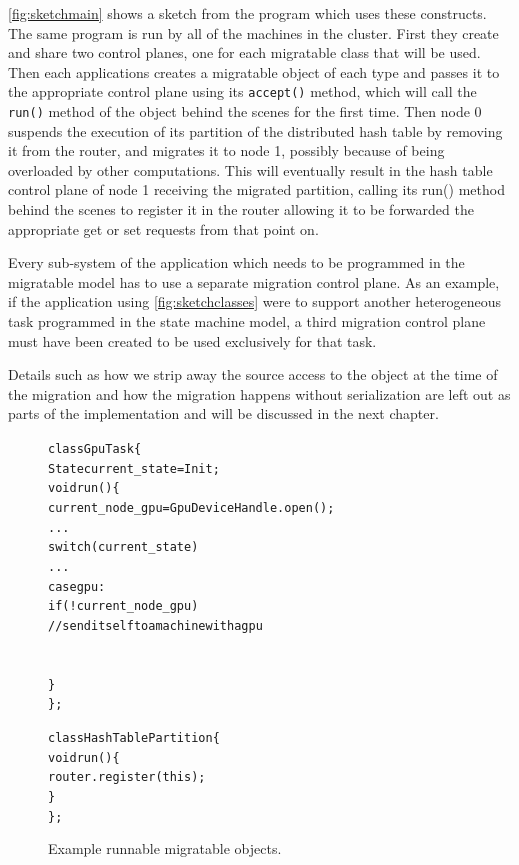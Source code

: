 \autoref{fig:sketchmain} shows
a sketch from the program which uses these constructs. The same program
is run by all of the machines in the cluster. First they create and share
two control planes, one for each migratable class that will be used.
Then each applications creates a migratable object of each type and passes
it to the appropriate control plane using its \texttt{accept()} method,
which will call the \texttt{run()} method of the object behind the scenes
for the first time. Then node 0 suspends the execution of its partition
    of the distributed hash table by removing it from the router,
    and migrates it to node 1, possibly because of being overloaded by
    other computations. This will eventually result in the hash table
    control plane of node 1 receiving the migrated partition, calling its
    run() method behind the scenes to register it in the router allowing
    it to be forwarded the appropriate get or set requests from that
    point on.

Every sub-system of the application which needs to be programmed in the
migratable model has to use a separate migration control plane. As an
example, if the application using \autoref{fig:sketchclasses} were to
support
another heterogeneous task programmed in the state machine model, a third
migration control plane must have been created to be used exclusively for
that task.

Details such as how we strip away the source access to the object at the
time of the migration and how the migration happens without serialization
are left out as parts of the implementation and will be discussed in the
next chapter.


\begin{figure}[t]
\begin{alltt}

class GpuTask \{
    State current_state = Init;
    void run() \{
        current_node_gpu = GpuDeviceHandle.open();
        ...
        switch(current_state) {
            ...
            case gpu:
              if(!current_node_gpu) {
                // send itself to a machine with a gpu
              }
        }
    \}
\};

class HashTablePartition \{
    void run() \{
        router.register(this);
    \}
\};
\end{alltt}
\caption{
    Example runnable migratable objects.
}
\label{fig:sketchclasses}
\end{figure}



